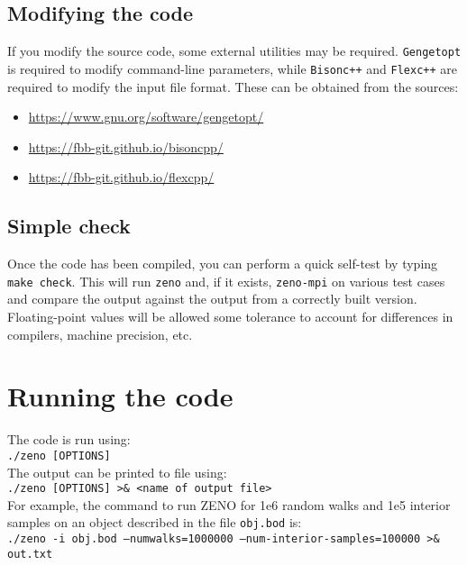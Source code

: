 \documentclass[12pt,letterpaper]{article}
\begin{document}
\subsection{Modifying the code}

\noindent If you modify the source code, some external utilities may be required.  \texttt{Gengetopt} is required to modify command-line parameters, while \texttt{Bisonc++} and \texttt{Flexc++} are required to modify the input file format.  These can be obtained from the sources:
\begin{itemize}
\item[] \url{https://www.gnu.org/software/gengetopt/}
\item[] \url{https://fbb-git.github.io/bisoncpp/}
\item[] \url{https://fbb-git.github.io/flexcpp/}
\end{itemize} 

\subsection{Simple check}

Once the code has been compiled, you can perform a quick self-test by typing \texttt{make check}.  This will run \texttt{zeno} and, if it exists, \texttt{zeno-mpi} on various test cases and compare the output against the output from a correctly built version.  Floating-point values will be allowed some tolerance to account for differences in compilers, machine precision, etc. 

\section{Running the code}
\label{sec:runcode}
The code is run using: \\

\texttt{./zeno [OPTIONS]} \\

\noindent The output can be printed to file using: \\

\texttt{./zeno [OPTIONS] >\& <name of output file>} \\

\noindent For example, the command to run ZENO for 1e6 random walks and 1e5 interior samples on an object described in the file \texttt{obj.bod} is: \\

\texttt{./zeno -i obj.bod --numwalks=1000000 --num-interior-samples=100000 >\& out.txt} \\
\end{document}
